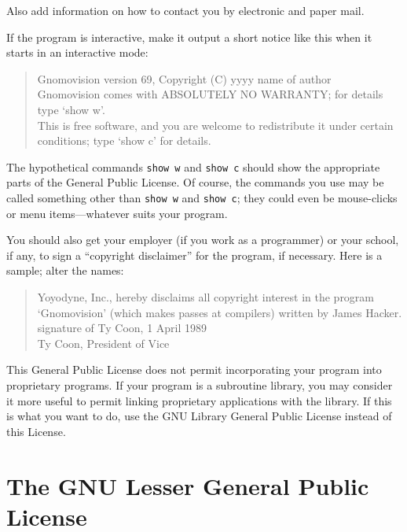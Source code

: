 \documentclass[12pt]{report}
\begin{document}
Also add information on how to contact you by electronic and paper mail.

If the program is interactive, make it output a short notice like this
when it starts in an interactive mode:

\begin{quote}
Gnomovision version 69, Copyright (C) yyyy  name of author \\
Gnomovision comes with ABSOLUTELY NO WARRANTY; for details type `show w'. \\
This is free software, and you are welcome to redistribute it
under certain conditions; type `show c' for details.
\end{quote}


The hypothetical commands {\tt show w} and {\tt show c} should show the
appropriate parts of the General Public License.  Of course, the commands
you use may be called something other than {\tt show w} and {\tt show c};
they could even be mouse-clicks or menu items---whatever suits your
program.

You should also get your employer (if you work as a programmer) or your
school, if any, to sign a ``copyright disclaimer'' for the program, if
necessary.  Here is a sample; alter the names:

\begin{quote}
Yoyodyne, Inc., hereby disclaims all copyright interest in the program \\
`Gnomovision' (which makes passes at compilers) written by James Hacker. \\

signature of Ty Coon, 1 April 1989 \\
Ty Coon, President of Vice
\end{quote}


This General Public License does not permit incorporating your program
into proprietary programs.  If your program is a subroutine library, you
may consider it more useful to permit linking proprietary applications
with the library.  If this is what you want to do, use the GNU Library
General Public License instead of this License.


\chapter{The GNU Lesser General Public License}
\end{document}

